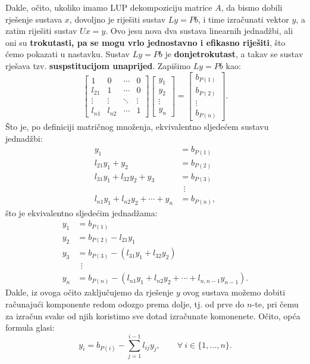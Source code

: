 \documentclass[a4paper,12pt,oneside]{article}
\begin{document}
\noindent Dakle, očito, ukoliko imamo LUP dekompoziciju matrice $A$, da bismo dobili rješenje sustava $x$, dovoljno je riješiti sustav
$Ly = Pb$, i time izračunati vektor $y$, a zatim riješiti sustav $Ux = y$.
\newline Ovo jesu nova dva sustava linearnih jednadžbi, ali oni su \textbf{trokutasti, pa se mogu vrlo jednostavno i efikasno riješiti}, što ćemo pokazati u nastavku.
\newline\newline
Sustav $Ly = Pb$ je \textbf{donjetrokutast}, a takav se sustav rješava tzv. \textbf{suspstitucijom unaprijed}.
\newline \newline Zapišimo $Ly = Pb$ kao:
$$
\left[\begin{matrix}1 & 0 & \cdots & 0\\
	l_{21} & 1 & \cdots & 0\\
	\vdots & \vdots & \ddots & \vdots\\
	l_{n1} & l_{n2} & \cdots &1\end{matrix}\right] \left[\begin{matrix}y_{1} \\ y_{2} \\ \vdots \\ y_{n}\end{matrix}\right]=\left[\begin{matrix}b_{P(1)} \\ b_{P(2)} \\ \vdots \\ b_{P(n)}\end{matrix}\right].
$$
Što je, po definiciji matričnog množenja, ekvivalentno sljedećem sustavu jednadžbi:
\begin{align*}
	y_1 &= b_{P(1)} \\
	l_{21}y_1 + y_2  &= b_{P(2)} \\
	l_{31}y_1 + l_{32}y_2 + y_3 &= b_{P(3)} \\
	& \ \ \vdots \\
	l_{n1}y_1 + l_{n2}y_2 + \cdots + y_n &= b_{P(n)}, 
\end{align*}
što je ekvivalentno sljedećim jednadžama:
\begin{align*}
	y_1 &= b_{P(1)} \\
    y_2 &= b_{P(2)} - l_{21}y_1\\
	y_3 &= b_{P(3)} - (l_{31}y_1 + l_{32}y_2)  \\
	& \ \ \vdots \\
	y_n &=b_{P(n)} - (l_{n1}y_1 + l_{n2}y_2 + \cdots + l_{n,n-1}y_{n-1}). 
\end{align*}
Dakle, iz ovoga očito zaključujemo da rješenje $y$ ovog sustava možemo dobiti računajući komponente redom odozgo prema dolje, tj. od prve do $n$-te, pri čemu za izračun svake od njih koristimo sve dotad izračunate komonenete. Očito, opća formula glasi:
$$y_i = b_{P(i)} - \sum_{j=1}^{i-1}l_{ij}y_j, \qquad \forall \ i \in \{1, \dots, n\} .$$
\end{document}
